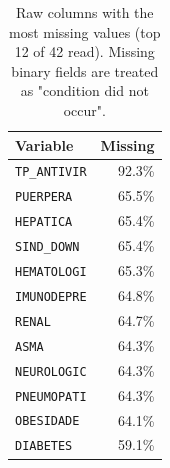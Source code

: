 \begin{table}
  \small
  \caption{Raw columns with the most missing values (top 12 of 42 read). Missing binary fields are treated as "condition did not occur".}
  \label{tab:missing-raw}
  \begin{tabular}{lr}
    \toprule
    Variable & Missing \\
    \midrule
    \texttt{TP\_ANTIVIR} & 92.3\% \\
    \texttt{PUERPERA} & 65.5\% \\
    \texttt{HEPATICA} & 65.4\% \\
    \texttt{SIND\_DOWN} & 65.4\% \\
    \texttt{HEMATOLOGI} & 65.3\% \\
    \texttt{IMUNODEPRE} & 64.8\% \\
    \texttt{RENAL} & 64.7\% \\
    \texttt{ASMA} & 64.3\% \\
    \texttt{NEUROLOGIC} & 64.3\% \\
    \texttt{PNEUMOPATI} & 64.3\% \\
    \texttt{OBESIDADE} & 64.1\% \\
    \texttt{DIABETES} & 59.1\% \\
    \bottomrule
  \end{tabular}
\end{table}
